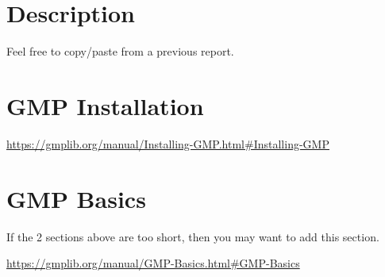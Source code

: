 \section{\cry{} Description}

Feel free to copy/paste from a previous report.


\section{GMP Installation}

\url{https://gmplib.org/manual/Installing-GMP.html#Installing-GMP}


\section{GMP Basics}

If the 2 sections above are too short,
then you may want to add this section.

\url{https://gmplib.org/manual/GMP-Basics.html#GMP-Basics}
